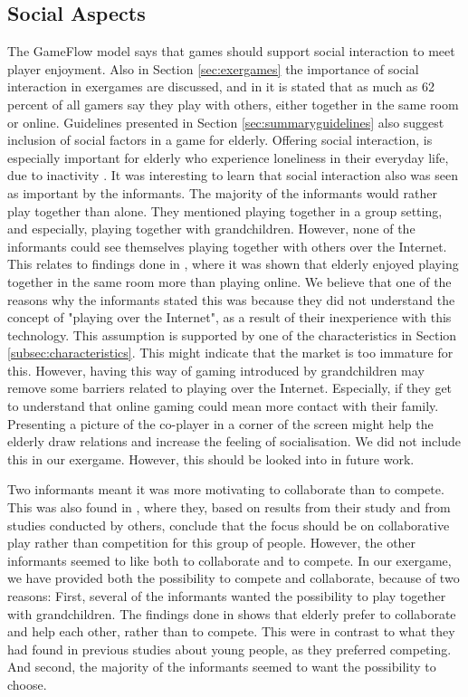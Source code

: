 \subsection{Social Aspects}
The GameFlow model says that games should support social interaction to meet player enjoyment. Also in Section \ref{sec:exergames} the importance of social interaction in exergames are discussed, and in \cite{statistics2012} it is stated that as much as 62 percent of all gamers say they play with others, either together in the same room or online. Guidelines presented in Section \ref{sec:summaryguidelines} also suggest inclusion of social factors in a game for elderly. Offering social interaction, is especially important for elderly who experience loneliness in their everyday life, due to inactivity \cite{exergamesforelderly}. It was interesting to learn that social interaction also was seen as important by the informants. The majority of the informants would rather play together than alone. They mentioned playing together in a group setting, and especially, playing together with grandchildren. However, none of the informants could see themselves playing together with others over the Internet. This relates to findings done in \cite{Gajadhar}, where it was shown that elderly enjoyed playing together in the same room more than playing online. We believe that one of the reasons why the informants stated this was because they did not understand the concept of "playing over the Internet", as a result of their inexperience with this technology. This assumption is supported by one of the characteristics in Section \ref{subsec:characteristics}. This might indicate that the market is too immature for this. However, having this way of gaming introduced by grandchildren may remove some barriers related to playing over the Internet. Especially, if they get to understand that online gaming could mean more contact with their family. Presenting a picture of the co-player in a corner of the screen might help the elderly draw relations and increase the feeling of socialisation. We did not include this in our exergame. However, this should be looked into in future work.


Two informants meant it was more motivating to collaborate than to compete. This was also found in \cite{Gajadhar}, where they, based on results from their study and from studies conducted by others, conclude that the focus should be on collaborative play rather than competition for this group of people. However, the other informants seemed to like both to collaborate and to compete. In our exergame, we have provided both the possibility to compete and collaborate, because of two reasons: First, several of the informants wanted the possibility to play together with grandchildren. The findings done in \cite{Gajadhar} shows that elderly prefer to collaborate and help each other, rather than to compete. This were in contrast to what they had found in previous studies about young people, as they preferred competing. And second, the majority of the informants seemed to want the possibility to choose. 

